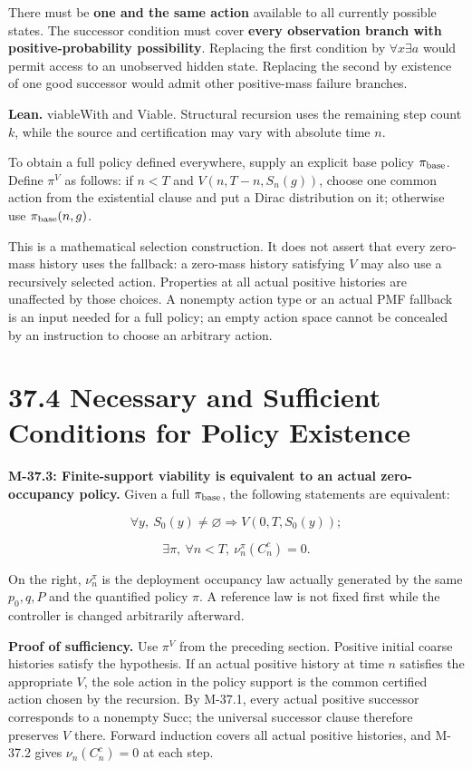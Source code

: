 \documentclass[
  english,
  11pt,
  oneside]{book}
\newcounter{none} %
\begin{document}
There must be \textbf{one and the same action} available to all currently possible states. The successor condition must cover \textbf{every observation branch with positive-probability possibility}. Replacing the first condition by \(\forall x\exists a\) would permit access to an unobserved hidden state. Replacing the second by existence of one good successor would admit other positive-mass failure branches.

\textbf{Lean.} viableWith and Viable. Structural recursion uses the remaining step count \(k\), while the source and certification may vary with absolute time \(n\).

To obtain a full policy defined everywhere, supply an explicit base policy \(\pi_{\rm base}\). Define \(\pi^V\) as follows: if \(n<T\) and \(V(n,T-n,S_n(g))\), choose one common action from the existential clause and put a Dirac distribution on it; otherwise use \(\pi_{\rm base}(n,g)\).

This is a mathematical selection construction. It does not assert that every zero-mass history uses the fallback: a zero-mass history satisfying \(V\) may also use a recursively selected action. Properties at all actual positive histories are unaffected by those choices. A nonempty action type or an actual PMF fallback is an input needed for a full policy; an empty action space cannot be concealed by an instruction to choose an arbitrary action.

\section{37.4 Necessary and Sufficient Conditions for Policy Existence}\label{necessary-and-sufficient-conditions-for-policy-existence}

\hypertarget{m-37-3}{}\label{m-37-3}

\textbf{M-37.3: Finite-support viability is equivalent to an actual zero-occupancy policy.} Given a full \(\pi_{\rm base}\), the following statements are equivalent:

\[\forall y,\ S_0(y)\ne\varnothing\Rightarrow V(0,T,S_0(y));\]

\[\exists\pi,\ \forall n<T,\ \nu_n^\pi(C_n^c)=0.\]

On the right, \(\nu_n^\pi\) is the deployment occupancy law actually generated by the same \(p_0,q,P\) and the quantified policy \(\pi\). A reference law is not fixed first while the controller is changed arbitrarily afterward.

\textbf{Proof of sufficiency.} Use \(\pi^V\) from the preceding section. Positive initial coarse histories satisfy the hypothesis. If an actual positive history at time \(n\) satisfies the appropriate \(V\), the sole action in the policy support is the common certified action chosen by the recursion. By M-37.1, every actual positive successor corresponds to a nonempty Succ; the universal successor clause therefore preserves \(V\) there. Forward induction covers all actual positive histories, and M-37.2 gives \(\nu_n(C_n^c)=0\) at each step.
\end{document}
